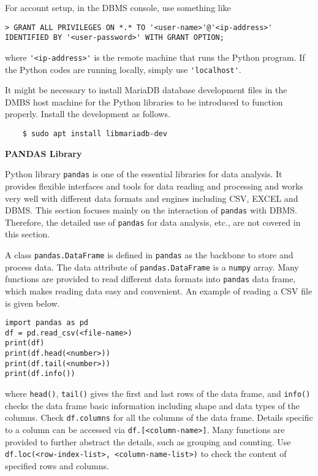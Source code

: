 For account setup, in the DBMS console, use something like
\begin{lstlisting}
> GRANT ALL PRIVILEGES ON *.* TO '<user-name>'@'<ip-address>' IDENTIFIED BY '<user-password>' WITH GRANT OPTION;
\end{lstlisting}
where \verb|'<ip-address>'| is the remote machine that runs the Python program. If the Python codes are running locally, simply use \verb|'localhost'|.

It might be necessary to install MariaDB database development files in the DMBS host machine for the Python libraries to be introduced to function properly. Install the development as follows.
\begin{lstlisting}
	$ sudo apt install libmariadb-dev
\end{lstlisting}

\vspace{0.1in}
\noindent \textbf{PANDAS Library}
\vspace{0.1in}

Python library \verb|pandas| is one of the essential libraries for data analysis. It provides flexible interfaces and tools for data reading and processing and works very well with different data formats and engines including CSV, EXCEL and DBMS. This section focuses mainly on the interaction of \verb|pandas| with DBMS. Therefore, the detailed use of \verb|pandas| for data analysis, etc., are not covered in this section.

A class \verb|pandas.DataFrame| is defined in \verb|pandas| as the backbone to store and process data. The data attribute of \verb|pandas.DataFrame| is a \verb|numpy| array. Many functions are provided to read different data formats into \verb|pandas| data frame, which makes reading data easy and convenient. An example of reading a CSV file is given below.
\begin{lstlisting}
import pandas as pd
df = pd.read_csv(<file-name>)
print(df)
print(df.head(<number>))
print(df.tail(<number>))
print(df.info())
\end{lstlisting}
where \verb|head()|, \verb|tail()| gives the first and last rows of the data frame, and \verb|info()| checks the data frame basic information including shape and data types of the columns. Check \verb|df.columns| for all the columns of the data frame. Details specific to a column can be accessed via \verb|df.[<column-name>]|. Many functions are provided to further abstract the details, such as grouping and counting. Use \verb|df.loc(<row-index-list>, <column-name-list>)| to check the content of specified rows and columns.

